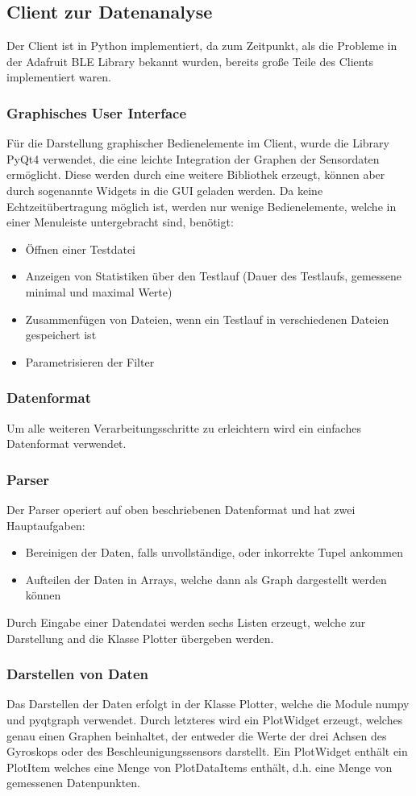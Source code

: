 \subsection{Client zur Datenanalyse}
Der Client ist in Python implementiert, da zum Zeitpunkt, als die Probleme in der Adafruit BLE Library bekannt wurden, bereits große Teile des Clients implementiert waren.
\subsubsection{Graphisches User Interface}
Für die Darstellung graphischer Bedienelemente im Client, wurde die Library PyQt4 verwendet, die eine leichte Integration der Graphen der Sensordaten ermöglicht. Diese werden durch eine weitere Bibliothek erzeugt, können aber durch sogenannte Widgets in die GUI geladen werden.
Da keine Echtzeitübertragung möglich ist, werden nur wenige Bedienelemente, welche in einer Menuleiste untergebracht sind, benötigt:
\begin{itemize}
\item Öffnen einer Testdatei
\item Anzeigen von Statistiken über den Testlauf (Dauer des Testlaufs, gemessene minimal und maximal Werte)
\item Zusammenfügen von Dateien, wenn ein Testlauf in verschiedenen Dateien gespeichert ist
\item Parametrisieren der Filter
\end{itemize}
\subsubsection{Datenformat}
Um alle weiteren Verarbeitungsschritte zu erleichtern wird ein einfaches Datenformat verwendet.
\subsubsection{Parser}
Der Parser operiert auf oben beschriebenen Datenformat und hat zwei Hauptaufgaben:
\begin{itemize}
 \item Bereinigen der Daten, falls unvollständige, oder inkorrekte Tupel ankommen
 \item Aufteilen der Daten in Arrays, welche dann als Graph dargestellt werden können
\end{itemize}
Durch Eingabe einer Datendatei werden sechs Listen erzeugt, welche zur Darstellung and die Klasse Plotter übergeben werden.
\subsubsection{Darstellen von Daten}
Das Darstellen der Daten erfolgt in der Klasse Plotter, welche die Module numpy und pyqtgraph verwendet. Durch letzteres wird ein PlotWidget erzeugt, welches genau einen Graphen beinhaltet, der entweder die Werte der drei Achsen des Gyroskops oder des Beschleunigungssensors darstellt.
Ein PlotWidget enthält ein PlotItem welches eine Menge von PlotDataItems enthält, d.h. eine Menge von gemessenen Datenpunkten.
